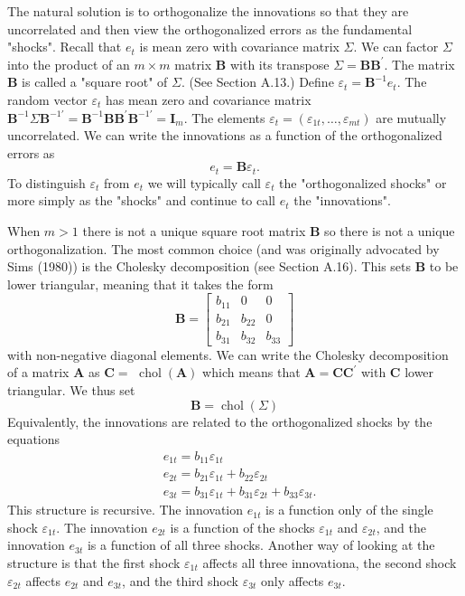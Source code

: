 \documentclass[10pt]{article}
\begin{document}
The natural solution is to orthogonalize the innovations so that they are uncorrelated and then view the orthogonalized errors as the fundamental "shocks". Recall that $e_{t}$ is mean zero with covariance matrix $\Sigma$. We can factor $\Sigma$ into the product of an $m \times m$ matrix $\boldsymbol{B}$ with its transpose $\Sigma=\boldsymbol{B} \boldsymbol{B}^{\prime}$. The matrix $\boldsymbol{B}$ is called a "square root" of $\Sigma$. (See Section A.13.) Define $\varepsilon_{t}=\boldsymbol{B}^{-1} e_{t}$. The random vector $\varepsilon_{t}$ has mean zero and covariance matrix $\boldsymbol{B}^{-1} \Sigma \boldsymbol{B}^{-1 \prime}=\boldsymbol{B}^{-1} \boldsymbol{B} \boldsymbol{B}^{\prime} \boldsymbol{B}^{-1 \prime}=\boldsymbol{I}_{m}$. The elements $\varepsilon_{t}=\left(\varepsilon_{1 t}, \ldots, \varepsilon_{m t}\right)$ are mutually uncorrelated. We can write the innovations as a function of the orthogonalized errors as
$$
e_{t}=\boldsymbol{B} \varepsilon_{t} .
$$
To distinguish $\varepsilon_{t}$ from $e_{t}$ we will typically call $\varepsilon_{t}$ the "orthogonalized shocks" or more simply as the "shocks" and continue to call $e_{t}$ the "innovations".

When $m>1$ there is not a unique square root matrix $\boldsymbol{B}$ so there is not a unique orthogonalization. The most common choice (and was originally advocated by Sims (1980)) is the Cholesky decomposition (see Section A.16). This sets $\boldsymbol{B}$ to be lower triangular, meaning that it takes the form
$$
\boldsymbol{B}=\left[\begin{array}{ccc}
b_{11} & 0 & 0 \\
b_{21} & b_{22} & 0 \\
b_{31} & b_{32} & b_{33}
\end{array}\right]
$$
with non-negative diagonal elements. We can write the Cholesky decomposition of a matrix $\boldsymbol{A}$ as $\boldsymbol{C}=$ $\operatorname{chol}(\boldsymbol{A})$ which means that $\boldsymbol{A}=\boldsymbol{C} \boldsymbol{C}^{\prime}$ with $\boldsymbol{C}$ lower triangular. We thus set
$$
\boldsymbol{B}=\operatorname{chol}(\Sigma)
$$
Equivalently, the innovations are related to the orthogonalized shocks by the equations
$$
\begin{aligned}
&e_{1 t}=b_{11} \varepsilon_{1 t} \\
&e_{2 t}=b_{21} \varepsilon_{1 t}+b_{22} \varepsilon_{2 t} \\
&e_{3 t}=b_{31} \varepsilon_{1 t}+b_{31} \varepsilon_{2 t}+b_{33} \varepsilon_{3 t} .
\end{aligned}
$$
This structure is recursive. The innovation $e_{1 t}$ is a function only of the single shock $\varepsilon_{1 t}$. The innovation $e_{2 t}$ is a function of the shocks $\varepsilon_{1 t}$ and $\varepsilon_{2 t}$, and the innovation $e_{3 t}$ is a function of all three shocks. Another way of looking at the structure is that the first shock $\varepsilon_{1 t}$ affects all three innovationa, the second shock $\varepsilon_{2 t}$ affects $e_{2 t}$ and $e_{3 t}$, and the third shock $\varepsilon_{3 t}$ only affects $e_{3 t}$.
\end{document}
